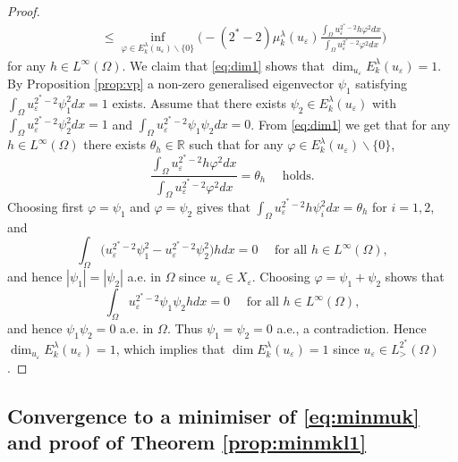 \documentclass[10pt]{amsart}
\numberwithin{equation}{section}
\newcommand{\R}{\mathbb{R}}
\newcommand{\ve}{\varepsilon}
\newcommand{\vp}{\varphi}
\newcommand{\Om}{\Omega}
\newcommand{\mkl}{\mu_{k}^{\lambda}}
\theoremstyle{plain}
\theoremstyle{remark}
\begin{document}
\begin{proof}
\begin{equation}
\begin{aligned}
  & \quad\le  \inf_{\vp \in E_k^{\lambda}(u_\ve)\backslash \{0\}} \Bigg( - (2^*-2) \mkl(u_\ve) \frac{\int_\Om u_\ve^{2^*-2}h \vp^2dx}{\int_\Om u_\ve^{2^*-2} \vp^2 dx}\Bigg) 
  \end{aligned} 
  \end{equation}
for any $h \in L^\infty(\Om)$. We claim that \eqref{eq:dim1} shows that $\dim_{u_\ve} E_k^{\lambda}(u_\ve) = 1$. By Proposition \ref{prop:vp} a non-zero generalised eigenvector $\psi_1$ satisfying $\int_\Om u_\ve^{2^*-2} \psi_1^2dx = 1$ exists. Assume that there exists $\psi_2 \in E_k^{\lambda}(u_\ve)$ with $\int_\Om u_\ve^{2^*-2} \psi_2^2dx = 1$ and $\int_{\Om} u_\ve^{2^*-2} \psi_1 \psi_2 dx = 0$. From  \eqref{eq:dim1} we get that for any $h \in L^\infty(\Om)$ there exists $\theta_h \in \R$ such that for any $\vp \in E_k^{\lambda}(u_\ve)\backslash \{0\}$, 
$$\frac{\int_\Om u_\ve^{2^*-2}h \vp^2dx}{\int_\Om u_\ve^{2^*-2} \vp^2 dx} = \theta_h \quad \text{ holds}.$$
Choosing first $\vp = \psi_1$ and $\vp = \psi_2$ gives that $\int_{\Om} u_\ve^{2^*-2} h \psi_i^2dx = \theta_h$ for $i=1,2$, and 
$$ \int_{\Om} \big( u_\ve^{2^*-2} \psi_1^2 -u_\ve^{2^*-2} \psi_2^2 \big)hdx = 0 \quad \text{ for all } h \in L^\infty(\Om),$$
and hence  $|\psi_1| = |\psi_2|$ a.e. in $\Om$ since $u_\ve \in X_\ve$. Choosing $\vp = \psi_1 + \psi_2$ shows that 
$$ \int_{\Om} u_\ve^{2^*-2} \psi_1 \psi_2 h dx = 0 \quad \text{ for all } h \in L^\infty(\Om), $$ 
and hence $ \psi_1 \psi_2 = 0$ a.e. in $\Om$. Thus $\psi_1 = \psi_2 = 0$ a.e., a contradiction. Hence $\dim_{u_\ve} E_k^{\lambda}(u_\ve) = 1$, which implies that $\dim E_k^{\lambda}(u_\ve) = 1$ since $u_\ve \in L^{2^*}_{>}(\Om)$. 
\end{proof}

\subsection{Convergence to a minimiser of \eqref{eq:minmuk} and proof of Theorem \ref{prop:minmkl1}} \label{minconvergence}
\end{document}
